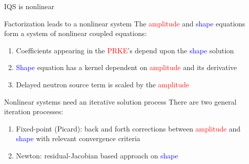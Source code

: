 \documentclass[8pt,xcolor=dvipnames]{beamer}
\newcommand{\ben}{\begin{enumerate}}
\newcommand{\een}{\end{enumerate}}
\newcommand{\tcr}[1]{\textcolor{red}{#1}}
\newcommand{\tcb}[1]{\textcolor{blue}{#1}}
\begin{document}
\begin{frame}{IQS is nonlinear}

\begin{block}{Factorization leads to a nonlinear system}
The \tcr{amplitude} and \tcb{shape} equations form a system of nonlinear coupled equations: 
\ben
\item Coefficients appearing in the \tcr{PRKE}'s depend upon the \tcb{shape} solution
\item \tcb{Shape} equation has a kernel dependent on \tcr{amplitude} and its derivative  
\item Delayed neutron source term is scaled by the \tcr{amplitude}
\een
\end{block}

\begin{block}{Nonlinear systems need an iterative solution process}
There are two general iteration processes: 
\begin{enumerate}
\item Fixed-point (Picard): back and forth corrections between \tcr{amplitude} and \tcb{shape} with relevant convergence criteria
\item Newton: residual-Jacobian based approach on \tcb{shape}
\end{enumerate}
\end{block}

\end{frame}
\end{document}
